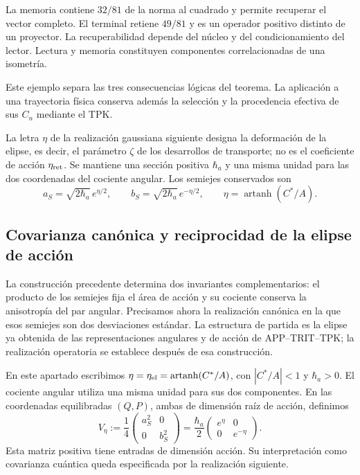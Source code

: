 La memoria contiene \(32/81\) de la norma al cuadrado y permite recuperar el vector completo. El terminal retiene \(49/81\) y es un operador positivo distinto de un proyector. La recuperabilidad depende del núcleo y del condicionamiento del lector. Lectura y memoria constituyen componentes correlacionadas de una isometría.

Este ejemplo separa las tres consecuencias lógicas del teorema. La
aplicación a una trayectoria física conserva además la selección y la
procedencia efectiva de sus \(C_n\) mediante el TPK.

La letra \(\eta\) de la realización gaussiana siguiente designa la
deformación de la elipse, es decir, el parámetro \(\zeta\) de los
desarrollos de transporte; no es el coeficiente de acción
\(\eta_{\rm ret}\). Se mantiene una sección positiva \(\hbar_a\) y
una misma unidad para las dos coordenadas del cociente angular.
Los semiejes conservados son
\[
 a_S=\sqrt{2\hbar_a}\,e^{\eta/2},\qquad
 b_S=\sqrt{2\hbar_a}\,e^{-\eta/2},\qquad
 \eta=\operatorname{artanh}(C^*/A).
\]

\subsection{Covarianza canónica y reciprocidad de la elipse de acción}
\label{md:antmem:covarianza-accion}

La construcción precedente determina dos invariantes complementarios:
el producto de los semiejes fija el área de acción y su cociente conserva
la anisotropía del par angular. Precisamos ahora la realización canónica
en la que esos semiejes son dos desviaciones estándar. La estructura de
partida es la elipse ya obtenida de las representaciones angulares y de
acción de APP--TRIT--TPK; la realización operatoria se establece después
de esa construcción.

En este apartado escribimos \(\eta=\eta_{\rm el}
=\operatorname{artanh}(C^*/A)\), con \(|C^*/A|<1\) y
\(\hbar_a>0\). El cociente angular utiliza una misma unidad para sus dos
componentes. En las coordenadas equilibradas \((Q,P)\), ambas de
dimensión raíz de acción, definimos
\begin{equation}
 V_\eta:=\frac14
 \begin{pmatrix}a_S^2&0\\0&b_S^2\end{pmatrix}
 =\frac{\hbar_a}{2}
 \begin{pmatrix}e^\eta&0\\0&e^{-\eta}\end{pmatrix}.
 \label{md:antmem:covarianza-geometrica}
\end{equation}
Esta matriz positiva tiene entradas de dimensión acción. Su interpretación
como covarianza cuántica queda especificada por la realización siguiente.

